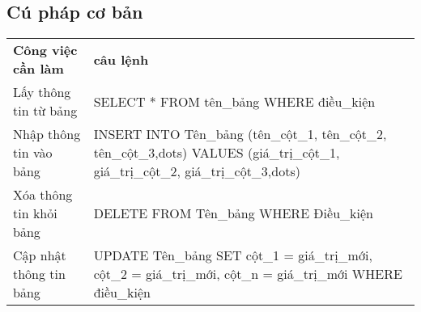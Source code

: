 \subsection{Cú pháp cơ bản}
\begin{center}

	\begin{tabularx}{\linewidth}{|l|X|}
		\cline{1-2}
		\textbf{Công việc cần làm} & \textbf{câu lệnh}                                                                                                                   \\ \cline{1-2}
		Lấy thông tin từ bảng      & SELECT * FROM tên\_bảng WHERE điều\_kiện                                                                                            \\ \cline{1-2}
		Nhập thông tin vào bảng    & INSERT INTO Tên\_bảng (tên\_cột\_1, tên\_cột\_2, tên\_cột\_3,dots) VALUES (giá\_trị\_cột\_1, giá\_trị\_cột\_2, giá\_trị\_cột\_3,dots) \\ \cline{1-2}
		Xóa thông tin khỏi bảng    & DELETE FROM Tên\_bảng WHERE Điều\_kiện                                                                                              \\ \cline{1-2}
		Cập nhật thông tin bảng    & UPDATE Tên\_bảng SET cột\_1 = giá\_trị\_mới, cột\_2 = giá\_trị\_mới, cột\_n = giá\_trị\_mới WHERE điều\_kiện                        \\ \cline{1-2}
	\end{tabularx}
\end{center}
